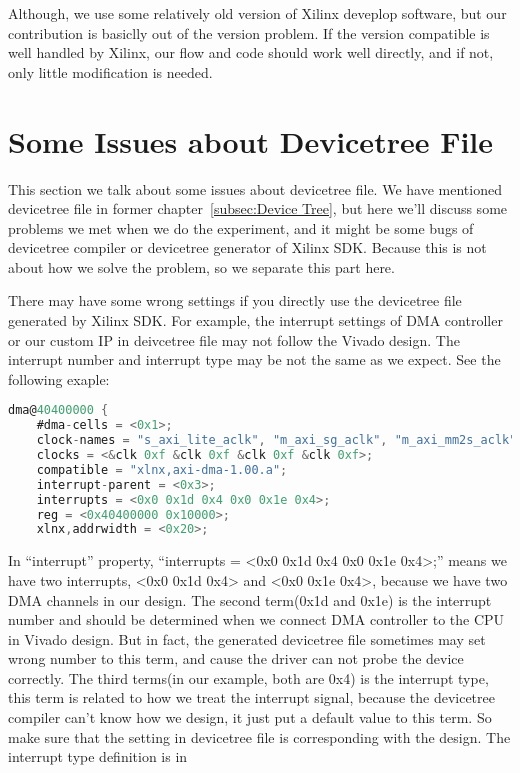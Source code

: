 Although, we use some relatively old version of Xilinx deveplop software, but our contribution is basiclly out of the version problem. If the version compatible is well handled by Xilinx, our flow and code should work well directly, and if not, only little modification is needed.

\newpage
\section{Some Issues about Devicetree File}
\label{sec:Some Issues about Devicetree File}
This section we talk about some issues about devicetree file. We have mentioned devicetree file in former chapter~\ref{subsec:Device Tree}, but here we'll discuss some problems we met when we do the experiment, and it might be some bugs of devicetree compiler or devicetree generator of Xilinx SDK. Because this is not about how we solve the problem, so we separate this part here.

There may have some wrong settings if you directly use the devicetree file generated by Xilinx SDK. For example, the interrupt settings of DMA controller or our custom IP in deivcetree file may not follow the Vivado design. The interrupt number and interrupt type 
may be not the same as we expect. See the following exaple:{}

{\renewcommand\baselinestretch{0.8}\selectfont
\begin{lstlisting}[frame=single,language=C]
dma@40400000 {
	#dma-cells = <0x1>;
	clock-names = "s_axi_lite_aclk", "m_axi_sg_aclk", "m_axi_mm2s_aclk", "m_axi_s2mm_aclk";
	clocks = <&clk 0xf &clk 0xf &clk 0xf &clk 0xf>;
	compatible = "xlnx,axi-dma-1.00.a";
	interrupt-parent = <0x3>;
	interrupts = <0x0 0x1d 0x4 0x0 0x1e 0x4>;
	reg = <0x40400000 0x10000>;
	xlnx,addrwidth = <0x20>;
\end{lstlisting}
\par}

In ``interrupt'' property,	``interrupts = <0x0 0x1d 0x4 0x0 0x1e 0x4>;'' means we have two interrupts, <0x0 0x1d 0x4> and <0x0 0x1e 0x4>, because we have two DMA channels in our design. The second term(0x1d and 0x1e) is the interrupt number and should be determined when we connect DMA controller to the CPU in Vivado design. But in fact, the generated devicetree file sometimes may set wrong number to this term, and  cause the driver can not probe the device correctly. The third terms(in our example, both are 0x4) is the interrupt type, this term is related to how we treat the interrupt signal, because the devicetree compiler can't know how we design, it just put a default value to this term. So make sure that the setting in devicetree file is corresponding with the design. The interrupt type definition is in \cite{intterrupttypes}

